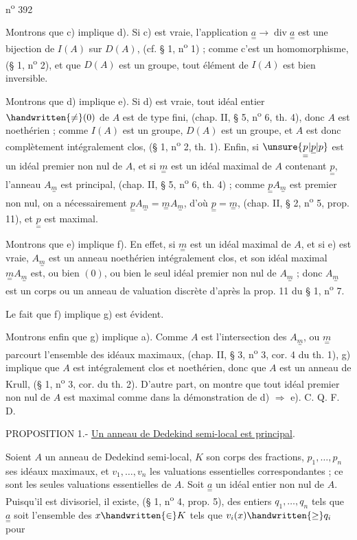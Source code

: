 \hfill n\textsuperscript{o} 392

Montrons que c) implique d). Si c) est vraie, l'application $\underset{=}{a}\longrightarrow\operatorname{div}\underset{=}{a}$ est une bijection de $I(A)$ sur $D(A)$, (cf. § 1, n\textsuperscript{o} 1) ; comme c'est un homomorphisme, (§ 1, n\textsuperscript{o} 2), et que $D(A)$ est un groupe, tout élément de $I(A)$ est bien inversible.

Montrons que d) implique e). Si d) est vraie, tout idéal entier $\handwritten{\ne}(0)$ de $A$ est de type fini, (chap. II, § 5, n\textsuperscript{o} 6, th. 4), donc $A$ est noethérien ; comme $I(A)$ est un groupe, $D(A)$ est un groupe, et $A$ est donc complètement intégralement clos, (§ 1, n\textsuperscript{o} 2, th. 1). Enfin, si $\unsure{\underset{=}{p}|\underline{p}|p}$ est un idéal premier non nul de $A$, et si $\underset{=}{m}$ est un idéal maximal de $A$ contenant $\underset{=}{p}$, l'anneau $A_{\underset{=}{m}}$ est principal, (chap. II, § 5, n\textsuperscript{o} 6, th. 4) ; comme $\underset{=}{p} A_{\underset{=}{m}}$ est premier non nul, on a nécessairement $\underset{=}{p} A_{\underset{=}{m}}=\underset{=}{m}A_{\underset{=}{m}}$, d'où $\underset{=}{p}=\underset{=}{m}$, (chap. II, § 2, n\textsuperscript{o} 5, prop. 11), et $\underset{=}{p}$ est maximal.

Montrons que e) implique f). En effet, si $\underset{=}{m}$ est un idéal maximal de $A$, et si e) est vraie, $A_{\underset{=}{m}}$ est un anneau noethérien intégralement clos, et son idéal maximal $\underset{=}{m}A_{\underset{=}{m}}$ est, ou bien $(0)$, ou bien le seul idéal premier non nul de $A_{\underset{=}{m}}$ ; donc $A_{\underset{=}{m}}$ est un corps ou un anneau de valuation discrète d'après la prop. 11 du § 1, n\textsuperscript{o} 7.

Le fait que f) implique g) est évident.

Montrons enfin que g) implique a). Comme $A$ est l'intersection des $A_{\underset{=}{m}}$, ou $\underset{=}{m}$ parcourt l'ensemble des idéaux maximaux, (chap. II, § 3, n\textsuperscript{o} 3, cor. 4 du th. 1), g) implique que $A$ est intégralement clos et noethérien, donc que $A$ est un anneau de Krull, (§ 1, n\textsuperscript{o} 3, cor. du th. 2). D'autre part, on montre que tout idéal premier non nul de $A$ est maximal comme dans la démonstration de d) $\Rightarrow$ e). C. Q. F. D.

PROPOSITION 1.- \uline{Un anneau de Dedekind semi-local est principal}.

Soient $A$ un anneau de Dedekind semi-local, $K$ son corps des fractions, $p_1,\ldots,p_n$ ses idéaux maximaux, et $v_1,\ldots,v_n$ les valuations essentielles correspondantes ; ce sont les seules valuations essentielles de $A$. Soit $\underset{=}{a}$ un idéal entier non nul de $A$. Puisqu'il est divisoriel, il existe, (§ 1, n\textsuperscript{o} 4, prop. 5), des entiers $q_1,\ldots,q_n$ tels que $\underset{=}{a}$ soit l'ensemble des $x\handwritten{\in}K$ tels que $v_i(x)\handwritten{\geq}q_i$ pour
